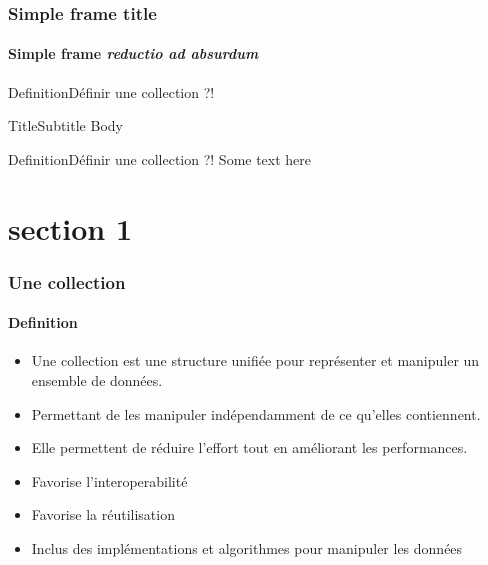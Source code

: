 





\begin{frame}[plain]
	\titlepage{}
\end{frame}

\begin{frame}[allowframebreaks]
	\frametitle{Simple frame title}
	\framesubtitle{Simple frame \textit{reductio ad absurdum}}
\end{frame}


\begin{sepframe}{Definition}{Définir une collection ?!}

\end{sepframe}

\begin{frameA}{Title}{Subtitle}
Body
\end{frameA}

\begin{frameB}{Definition}{Définir une collection ?!}
Some text here
\end{frameB}

\section{section 1}
\begin{frame}
	\frametitle{Une collection}
    \framesubtitle{Definition}

    \begin{itemize}
        \item Une collection est une structure unifiée pour représenter et manipuler un ensemble de données.
        \item Permettant de les manipuler indépendamment de ce qu'elles contiennent.
        \item Elle permettent de réduire l'effort tout en améliorant les performances\footnotemark.
        \item Favorise l'interoperabilité
        \item Favorise la réutilisation
        \item Inclus des implémentations et algorithmes pour manipuler les données
    \end{itemize}

\end{frame}

